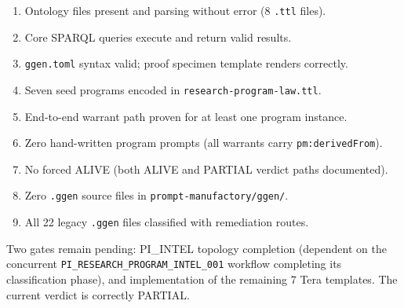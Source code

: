 \begin{enumerate}
  \item Ontology files present and parsing without error (8 \texttt{.ttl} files).
  \item Core SPARQL queries execute and return valid results.
  \item \texttt{ggen.toml} syntax valid; proof specimen template renders correctly.
  \item Seven seed programs encoded in \texttt{research-program-law.ttl}.
  \item End-to-end warrant path proven for at least one program instance.
  \item Zero hand-written program prompts (all warrants carry \texttt{pm:derivedFrom}).
  \item No forced ALIVE (both ALIVE and PARTIAL verdict paths documented).
  \item Zero \texttt{.ggen} source files in \texttt{prompt-manufactory/ggen/}.
  \item All 22 legacy \texttt{.ggen} files classified with remediation routes.
\end{enumerate}

Two gates remain pending: PI\_INTEL topology completion (dependent on the concurrent
\texttt{PI\_RESEARCH\_PROGRAM\_INTEL\_001} workflow completing its classification phase),
and implementation of the remaining 7 Tera templates. The current verdict is correctly
PARTIAL.
